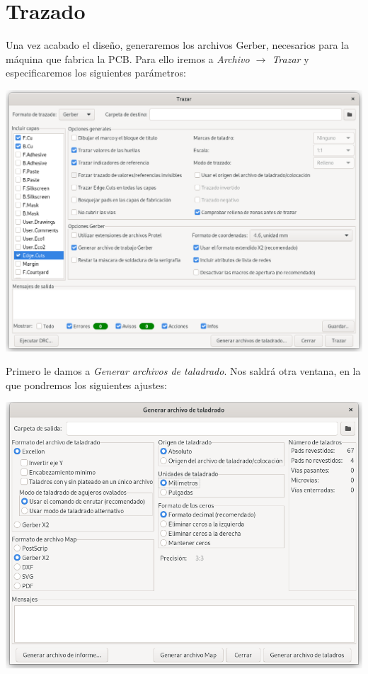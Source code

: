 \section{Trazado}

Una vez acabado el diseño, generaremos los archivos Gerber, necesarios para la
máquina que fabrica la PCB. Para ello iremos a
\emph{Archivo $\rightarrow$ Trazar} y especificaremos los siguientes
parámetros:

\includegraphics[width=\linewidth]{gerber-file-generation.png}

Primero le damos a \emph{Generar archivos de taladrado}. Nos saldrá otra
ventana, en la que pondremos los siguientes ajustes:

\includegraphics[width=\linewidth]{gerber-drilling-file-generation.png}

